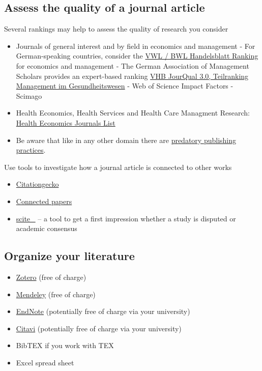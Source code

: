 \documentclass[
]{book}
\providecommand{\tightlist}{%
  \setlength{\itemsep}{0pt}\setlength{\parskip}{0pt}}
\begin{document}
\hypertarget{assess-the-quality-of-a-journal-article}{%
\subsection{Assess the quality of a journal
article}\label{assess-the-quality-of-a-journal-article}}

Several rankings may help to assess the quality of research you consider

\begin{itemize}
\tightlist
\item
  Journals of general interest and by field in economics and management
  - For German-speaking countries, consider the
  \href{https://www.forschungsmonitoring.org/}{VWL / BWL Handelsblatt
  Ranking} for economics and management - The German Association of
  Management Scholars provides an expert-based ranking
  \href{https://vhbonline.org/vhb4you/vhb-jourqual/vhb-jourqual-3/tabellen-zum-download}{VHB
  JourQual 3.0, Teilranking Management im Gesundheitswesen} - Web of
  Science Impact Factors - Scimago
\item
  Health Economics, Health Services and Health Care Managment Research:
  \href{https://www.mthooddiabeteschallenge.com/journal-list}{Health
  Economics Journals List}
\item
  Be aware that like in any other domain there are
  \href{https://predatoryjournals.com/}{predatory publishing practices}.
\end{itemize}

Use tools to investigate how a journal article is connected to other
works

\begin{itemize}
\tightlist
\item
  \href{https://citationgecko.azurewebsites.net/}{Citationgecko}
\item
  \href{https://www.connectedpapers.com}{Connected papers}
\item
  \href{https://scite.ai/}{scite\_} -- a tool to get a first impression
  whether a study is disputed or academic consensus
\end{itemize}

\hypertarget{organize-your-literature}{%
\subsection{Organize your literature}\label{organize-your-literature}}

\begin{itemize}
\tightlist
\item
  \href{https://www.zotero.org/}{Zotero} (free of charge)
\item
  \href{https://www.mendeley.com/guides/desktop}{Mendeley} (free of
  charge)
\item
  \href{https://endnote.com/}{EndNote} (potentially free of charge via
  your university)
\item
  \href{https://www.citavi.com/de}{Citavi} (potentially free of charge
  via your university)
\item
  BibTEX if you work with TEX
\item
  Excel spread sheet
\end{itemize}
\end{document}
